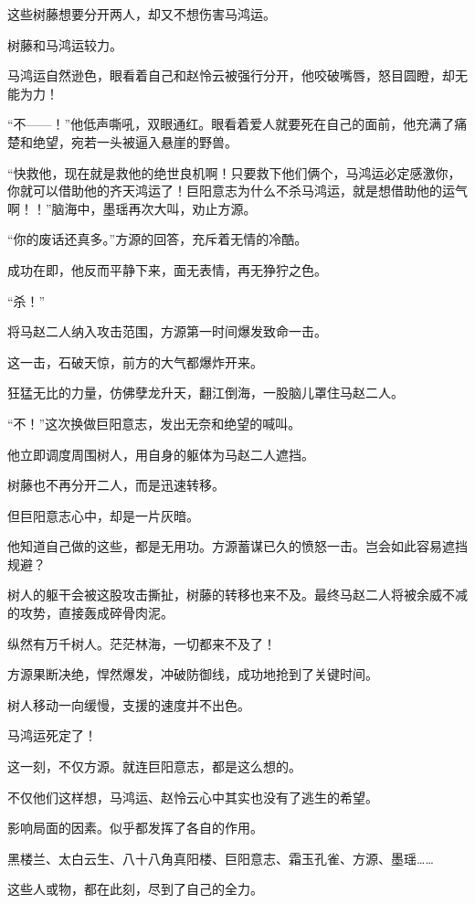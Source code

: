 \begin{this_body}
这些树藤想要分开两人，却又不想伤害马鸿运。

树藤和马鸿运较力。

马鸿运自然逊色，眼看着自己和赵怜云被强行分开，他咬破嘴唇，怒目圆瞪，却无能为力！

“不——！”他低声嘶吼，双眼通红。眼看着爱人就要死在自己的面前，他充满了痛楚和绝望，宛若一头被逼入悬崖的野兽。

“快救他，现在就是救他的绝世良机啊！只要救下他们俩个，马鸿运必定感激你，你就可以借助他的齐天鸿运了！巨阳意志为什么不杀马鸿运，就是想借助他的运气啊！！”脑海中，墨瑶再次大叫，劝止方源。

“你的废话还真多。”方源的回答，充斥着无情的冷酷。

成功在即，他反而平静下来，面无表情，再无狰狞之色。

“杀！”

将马赵二人纳入攻击范围，方源第一时间爆发致命一击。

这一击，石破天惊，前方的大气都爆炸开来。

狂猛无比的力量，仿佛孽龙升天，翻江倒海，一股脑儿罩住马赵二人。

“不！”这次换做巨阳意志，发出无奈和绝望的喊叫。

他立即调度周围树人，用自身的躯体为马赵二人遮挡。

树藤也不再分开二人，而是迅速转移。

但巨阳意志心中，却是一片灰暗。

他知道自己做的这些，都是无用功。方源蓄谋已久的愤怒一击。岂会如此容易遮挡规避？

树人的躯干会被这股攻击撕扯，树藤的转移也来不及。最终马赵二人将被余威不减的攻势，直接轰成碎骨肉泥。

纵然有万千树人。茫茫林海，一切都来不及了！

方源果断决绝，悍然爆发，冲破防御线，成功地抢到了关键时间。

树人移动一向缓慢，支援的速度并不出色。

马鸿运死定了！

这一刻，不仅方源。就连巨阳意志，都是这么想的。

不仅他们这样想，马鸿运、赵怜云心中其实也没有了逃生的希望。

影响局面的因素。似乎都发挥了各自的作用。

黑楼兰、太白云生、八十八角真阳楼、巨阳意志、霜玉孔雀、方源、墨瑶……

这些人或物，都在此刻，尽到了自己的全力。


\end{this_body}
